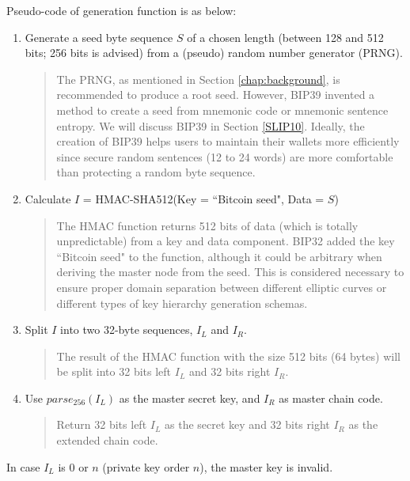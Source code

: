 Pseudo-code of generation function is as below:

\begin{enumerate}
    \item Generate a seed byte sequence $S$ of a chosen length (between 128 and 512 bits; 256 bits is advised) from a (pseudo) random number generator (PRNG).

          \begin{quote}
              The PRNG, as mentioned in Section \ref{chap:background}, is recommended to produce a root seed. However, BIP39 \cite{github/bip0039} invented a method to create a seed from mnemonic code or mnemonic sentence entropy. We will discuss BIP39 in Section \ref{SLIP10}. Ideally, the creation of BIP39 helps users to maintain their wallets more efficiently since secure random sentences (12 to 24 words) are more comfortable than protecting a random byte sequence.
          \end{quote}

    \item Calculate $I$ = HMAC-SHA512(Key = ``Bitcoin seed", Data = $S$)
          \begin{quote}
              The HMAC function returns 512 bits of data (which is totally unpredictable) from a key and data component. BIP32 added the key ``Bitcoin seed" to the function, although it could be arbitrary when deriving the master node from the seed. This is considered necessary to ensure proper domain separation between different elliptic curves or different types of key hierarchy generation schemas.
          \end{quote}

    \item Split $I$ into two 32-byte sequences, $I_L$ and $I_R$.

          \begin{quote}
              The result of the HMAC function with the size 512 bits (64 bytes) will be split into 32 bits left  $I_L$ and 32 bits right $I_R$.
          \end{quote}
    \item Use $parse_{256}(I_L)$ as the master secret key, and $I_R$ as master chain code.

          \begin{quote}
              Return 32 bits left $I_L$ as the secret key and 32 bits right $I_R$ as the extended chain code.
          \end{quote}

\end{enumerate}
In case $I_L$ is 0 or $n$ (private key  order $n$), the master key is invalid.

